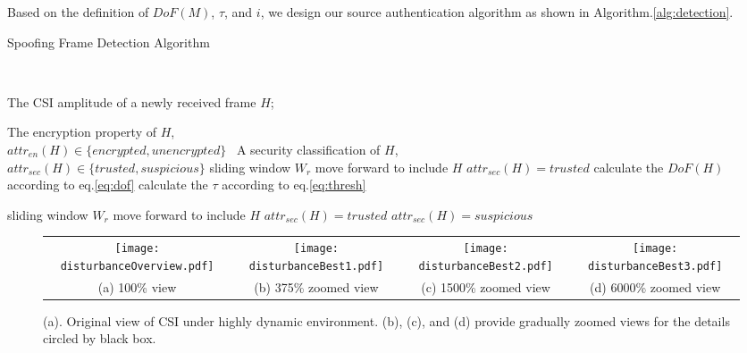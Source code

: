 \documentclass[conference]{IEEEtran}
\begin{document}
Based on the definition of $DoF(M)$, $\tau$, and $i$, we design our source
authentication algorithm as shown in Algorithm.\ref{alg:detection}.

\begin{algorithm}[ht]
\caption{Spoofing Frame Detection Algorithm}
\label{alg:detection}
\begin{algorithmic}[1]
\REQUIRE \

The CSI amplitude of a newly received frame $H$;\

The encryption property of $H$, \\
 $attr_{en}(H)\in\{encrypted,unencrypted\}$
\ENSURE \
A security classification of $H$, \\
$attr_{sec}(H)\in\{trusted,suspicious\}$
\STATE sliding window $W_r$ move forward to include $H$
\STATE $attr_{sec}(H)=trusted$
\ELSE
\STATE calculate the $DoF(H)$ according to eq.\ref{eq:dof}
\STATE calculate the $\tau$ according to eq.\ref{eq:thresh}

\STATE sliding window $W_r$ move forward to include $H$
\STATE $attr_{sec}(H)=trusted$
\ELSE
\STATE $attr_{sec}(H)=suspicious$
\ENDIF
\ENDIF
\ENDFOR
\end{algorithmic}
\end{algorithm}

\begin{figure*}[!t]
\begin{center}
\begin{tabular}{cccc}
\hspace{-0.1in}
\texttt{[image: disturbanceOverview.pdf]} \hspace{-0.1in} &
\texttt{[image: disturbanceBest1.pdf]} \hspace{-0.15in} &
\texttt{[image: disturbanceBest2.pdf]} \hspace{-0.15in} &
\texttt{[image: disturbanceBest3.pdf]} \\
(a) 100\% view & (b) 375\% zoomed view & (c) 1500\% zoomed view & (d) 6000\% zoomed view
\end{tabular}
\end{center}
\caption{(a). Original view of CSI under highly dynamic
  environment. (b), (c), and (d) provide gradually zoomed views for the details circled by black box. }

\label{fig:highresolution}
\vspace{-0.1in}
\end{figure*}
\end{document}
